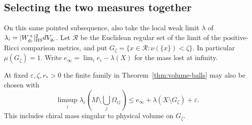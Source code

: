 \subsection{Selecting the two measures together}

On this same pointed subsequence, also take the local weak limit
\(\lambda\) of \(\lambda_i=|W^+_{g_i}|^2_{\rm HS}dV_{g_i}\).
Let \(\mathcal R\) be the Euclidean regular set of the limit of
the positive-Ricci comparison metrics, and put
\(G_\zeta=\{x\in\mathcal R:\nu(\{x\})<\zeta\}\).
In particular \(\mu(G_\zeta)=1\). Write
\(e_\infty=\lim_i e_i-\lambda(X)\) for the mass lost at infinity.

\begin{proposition}\label{prop:joint-vol}
At fixed \(\varepsilon,\zeta,r_*>0\) the finite family in
Theorem~\ref{thm:volume-balls} may also be chosen with
\[
 \limsup_i\lambda_i(M\setminus\textstyle\bigcup_j\Omega_{ij})
 \le e_\infty+\lambda(X\setminus G_\zeta)+\varepsilon .
\]
This includes chiral mass singular to physical volume on \(G_\zeta\).
\end{proposition}
